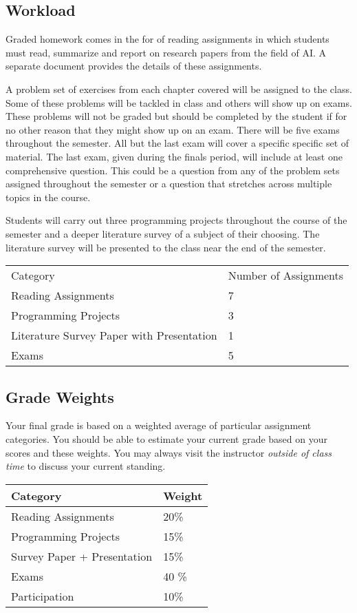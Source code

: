 \documentclass[]{tufte-handout}
\begin{document}
\subsection{Workload}

Graded homework comes in the for of reading assignments in which students must read, summarize and report on research papers from the field of AI\@.  A separate document provides the details of these assignments.

A problem set of exercises from each chapter covered will be assigned to the class. Some of these problems will be tackled in class and others will show up on exams.  These problems will not be graded but should be completed by the student if for no other reason that they might show up on an exam. There will be five exams throughout the semester. All but the last exam will cover a specific specific set of material. The last exam, given during the finals period, will include at least one comprehensive question. This could be a question from any of the problem sets assigned throughout the semester or a question that stretches across multiple topics in the course.

Students will carry out three programming projects throughout the course of the semester and a deeper literature survey of a subject of their choosing. The literature survey will be presented to the class near the end of the semester.

\begin{center}
  \begin{tabular}{ll}
    Category & Number of Assignments \\
    Reading Assignments & 7 \\
    Programming Projects & 3 \\
    Literature Survey Paper with Presentation & 1 \\
    Exams & 5 \\
  \end{tabular}
\end{center}


\subsection{Grade Weights}

Your final grade is based on a weighted average of particular assignment categories.  You should be able to estimate your current grade based on your scores and these weights.  You may always visit the instructor \textit{outside of class time} to discuss your current standing.
\begin{center}
\begin{tabular}{ll}
  Category & Weight \\ \toprule
  Reading Assignments & 20\% \\ %
  Programming Projects  & 15\% \\ %
  Survey Paper + Presentation & 15\% \\ %
  Exams & 40 \% \\ %
  Participation & 10\%
\end{tabular}
\end{center}
\end{document}
